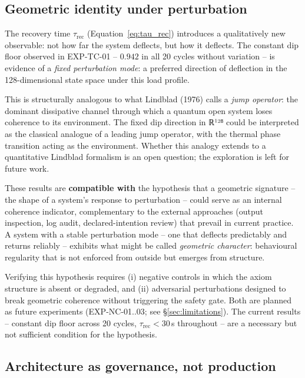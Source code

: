 \documentclass[11pt, a4paper]{article}
\begin{document}
\subsection{Geometric identity under perturbation}

The recovery time $\tau_\text{rec}$ (Equation~\ref{eq:tau_rec}) introduces a
qualitatively new observable: not how far the system deflects, but how it
deflects.  The constant dip floor observed in EXP-TC-01 -- $0.942$ in all 20
cycles without variation -- is evidence of a \emph{fixed perturbation mode}: a
preferred direction of deflection in the 128-dimensional state space under this
load profile.

This is structurally analogous to what Lindblad (1976) calls a \emph{jump
operator}: the dominant dissipative channel through which a quantum open system
loses coherence to its environment.  The fixed dip direction in ℝ¹²⁸ could
be interpreted as the classical analogue of a leading jump operator, with the
thermal phase transition acting as the environment.
Whether this analogy extends to a quantitative Lindblad formalism is an open
question; the exploration is left for future work.

These results are \textbf{compatible with} the hypothesis that a geometric
signature -- the shape of a system's response to perturbation -- could serve
as an internal coherence indicator, complementary to the external approaches
(output inspection, log audit, declared-intention review) that prevail in
current practice.
A system with a stable perturbation mode -- one that deflects predictably and
returns reliably -- exhibits what might be called \emph{geometric character}:
behavioural regularity that is not enforced from outside but emerges from
structure.

Verifying this hypothesis requires (i) negative controls in which the axiom
structure is absent or degraded, and (ii) adversarial perturbations designed
to break geometric coherence without triggering the safety gate.
Both are planned as future experiments (EXP-NC-01..03; see \S\ref{sec:limitations}).
The current results -- constant dip floor across 20 cycles, $\tau_\text{rec}
< 30$\,s throughout -- are a necessary but not sufficient condition for the
hypothesis.

\subsection{Architecture as governance, not production}
\label{sec:governance}
\end{document}
